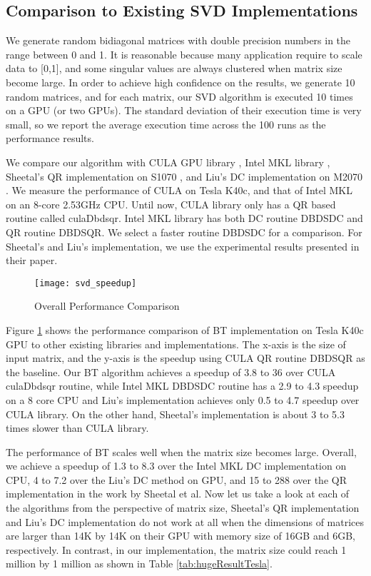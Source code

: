 \subsection{Comparison to Existing SVD Implementations}
We generate random bidiagonal matrices with double precision numbers in the range between 0 and 1.
It is reasonable because many application require to scale data to [0,1], and some singular values are always clustered when matrix size become large.
In order to achieve high confidence on the results, we generate 10 random matrices, and for each matrix, our SVD algorithm is executed 10 times on a GPU (or two GPUs).
The standard deviation of their execution time is very small, so we report the average execution time across the 100 runs as the performance results.

We compare our algorithm with CULA GPU library \cite{cula}, Intel MKL library \cite{mkl}, Sheetal's QR implementation on S1070 \cite{09IPDPSQR}, and Liu's DC implementation on M2070 \cite{13CFDC}.
We measure the performance of CULA on Tesla K40c, and that of Intel MKL on an 8-core 2.53GHz CPU.
Until now, CULA library only has a QR based routine called culaDbdsqr.
Intel MKL library has both DC routine DBDSDC and QR routine DBDSQR. We select a faster routine DBDSDC for a comparison.
For Sheetal's \cite{09IPDPSQR} and Liu's \cite{13CFDC} implementation, we use the experimental results presented in their paper. 

\begin{figure}[hbpt]
\vspace{-0.3in}
\centering
\texttt{[image: svd\_speedup]}
\vspace{-0.1in}
\caption{Overall Performance Comparison}
\label{fig:svd_speedup}
\vspace{-0.3in}
\end{figure}
Figure \ref{fig:svd_speedup} shows the performance comparison of BT
implementation on Tesla K40c GPU to other existing libraries
and implementations.
The x-axis is the size of input matrix, and the y-axis is the speedup
using CULA QR routine DBDSQR as the baseline.
Our BT algorithm achieves a speedup of 3.8 to 36 over CULA culaDbdsqr routine,
while Intel MKL DBDSDC routine has a 2.9 to 4.3 speedup on a 8 core CPU and Liu's implementation achieves only 0.5 to 4.7 speedup over CULA library.
On the other hand, Sheetal's implementation is about 3 to 5.3 times slower than CULA library.

The performance of BT scales well when the matrix size becomes large.
Overall, we achieve a speedup of 1.3 to 8.3 over the Intel MKL
DC implementation on CPU, 4 to 7.2 over the Liu's
DC method on GPU, and 15 to 288 over the QR implementation in the work by Sheetal et al.
Now let us take a look at each of the algorithms from the perspective of matrix size, Sheetal's QR implementation and Liu's DC implementation do not work at all when the dimensions of matrices are larger than 14K by 14K on their GPU with memory size of 16GB and 6GB, respectively. In contrast, in our implementation, the matrix size could reach 1 million by 1 million as shown in Table \ref{tab:hugeResultTesla}.

